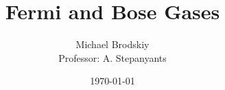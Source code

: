 


\title{Fermi and Bose Gases}
\date{\today}
\author{Michael Brodskiy\\ \small Professor: A. Stepanyants}



\maketitle

